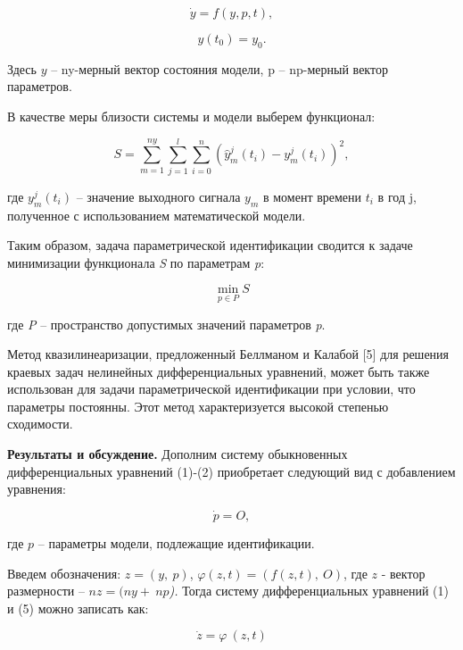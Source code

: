 \begin{multicols}{2}
\begin{equation}
\dot{y} = f(y,p,t),
\end{equation}

\begin{equation}
y\left( t_{0} \right) = y_{0}.
\end{equation}

Здесь \(y\) -- ny-мерный вектор состояния модели, p -- np-мерный вектор
параметров.

В качестве меры близости системы и модели выберем функционал:

\begin{equation}
S = \sum_{m = 1}^{ny}{\sum_{j = 1}^{l}{\sum_{i = 0}^{n}{({\widehat{y}}_{m}^{j}\left( t_{i} \right) - y_{m}^{j}\left( t_{i} \right))}^{2}}},
\end{equation}

где \(y_{m}^{j}(t_{i})\) -- значение
выходного сигнала \(y_{m}\) в момент времени \(t_{i}\) в год j,
полученное с использованием математической модели.

Таким образом, задача параметрической идентификации сводится к задаче
минимизации функционала \emph{S} по параметрам \emph{p}:

\begin{equation}
\min_{p \in P}S
\end{equation}

где \emph{P} -- пространство допустимых значений параметров \emph{p}.

Метод квазилинеаризации, предложенный Беллманом и Калабой {[}5{]} для
решения краевых задач нелинейных дифференциальных уравнений, может быть
также использован для задачи параметрической идентификации при условии,
что параметры постоянны. Этот метод характеризуется высокой степенью
сходимости.

{\bfseries Результаты и обсуждение.} Дополним систему обыкновенных
дифференциальных уравнений (1)-(2) приобретает следующий вид с
добавлением уравнения:

\begin{equation}
\dot{p} = O,
\end{equation}

где \(p\) -- параметры модели, подлежащие идентификации.

Введем обозначения: \(z = (y,\ p)\),
\(\varphi(z,t) = \left( f(z,t),\ O \right)\), где \(z\) - вектор
размерности -- \(nz = (ny + \ np\)\emph{).} Тогда систему
дифференциальных уравнений (1) и (5) можно записать как:

\begin{equation}
\dot{z} = \varphi\ (z,t)
\end{equation}


\end{multicols}
